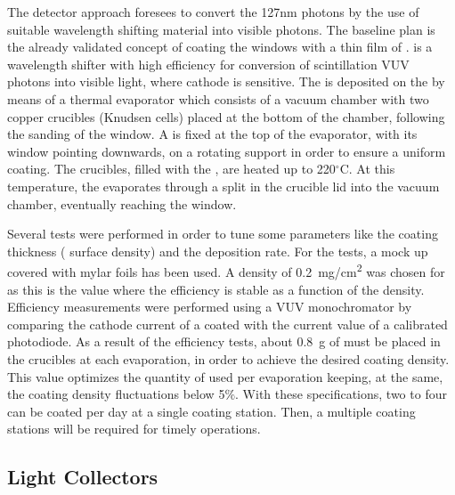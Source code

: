 The detector approach foresees to convert the \si{127}{nm} photons by the use of suitable wavelength shifting material into visible photons. The baseline plan is the already validated concept of coating the  windows with a thin film of  \cite{tpb}.  is a wavelength shifter with high efficiency for conversion of \lar scintillation VUV photons into visible light, where  cathode is sensitive. The  is deposited on the  by means of a thermal evaporator which consists of a vacuum chamber with two copper crucibles (Knudsen cells) placed at the bottom of the chamber, following the sanding of the  window. A  is fixed at the top of the evaporator, with its window pointing downwards, on a rotating support in order to ensure a uniform coating. The crucibles, filled with the , are heated up to \si{220}{$^\circ$C}. At this temperature, the  evaporates through a split in the crucible lid into the vacuum chamber, eventually reaching the  window.

Several tests were performed in order to tune some parameters like the coating thickness ( surface density) and the deposition rate. For the tests, a  mock up covered with mylar foils has been used. A  density of \SI{0.2}{mg/cm^2} was chosen for  as this is the value where the  efficiency is stable as a function of the density. Efficiency measurements were performed using a VUV monochromator by comparing the cathode current of a coated  with the current value of a calibrated photodiode. As a result of the efficiency tests, about \SI{0.8}{g} of  must be placed in the crucibles at each evaporation, in order to achieve the desired  coating density. %
This value optimizes the quantity of  used per evaporation keeping, at the same, the coating density fluctuations below \num{5}$\%$. With these specifications, two to four  can be coated per day at a single coating station. Then, a multiple coating stations will be required for timely operations.

\subsection{Light Collectors}
\label{sec:fddp-pd-2.5}

